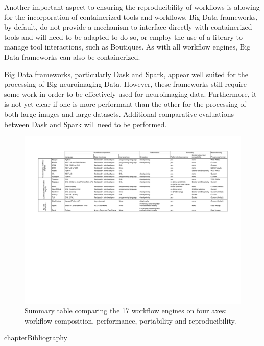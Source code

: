 \documentclass{report}
\begin{document}
        Another important aspect to ensuring the reproducibility of workflows
        is allowing for the incorporation of containerized tools and workflows.
        Big Data frameworks, by default, do not provide a mechanism to interface
        directly with containerized tools and will need to be adapted to do so,
        or employ the use of a library to manage tool interactions, such as 
        Boutiques. As with all workflow engines, Big Data frameworks can also 
        be containerized.

        Big Data frameworks, particularly Dask and Spark, appear well suited for
        the processing of Big neuroimaging Data. However, these frameworks still
        require some work in order to be effectively used for neuroimaging data.
        Furthermore, it is not yet clear if one is more performant than the other
        for the processing of both large images and large datasets. Additional
        comparative evaluations between Dask and Spark will need to be performed.

    \begin{figure}
        \centering
        \includegraphics[width=\textwidth,height=\textheight,keepaspectratio]{Figures/summary.pdf}
        \caption{Summary table comparing the 17 workflow engines on four axes:
        workflow composition, performance, portability and reproducibility.}
        \label{fig:summary}
    \end{figure} 
        {chapter}{Bibliography} 
        
        
\end{document}
